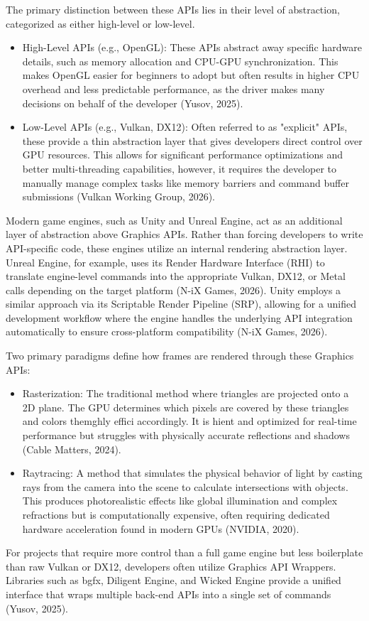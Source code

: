 \documentclass[manuscript,screen,12pt]{article}
\begin{document}
The primary distinction between these APIs lies in their level of abstraction, categorized as either high-level or low-level.

\begin{itemize}
	\item High-Level APIs (e.g., OpenGL): These APIs abstract away specific hardware details, such as memory allocation and CPU-GPU synchronization. This makes OpenGL easier for beginners to adopt but often results in higher CPU overhead and less predictable performance, as the driver makes many decisions on behalf of the developer (Yusov, 2025).
	\item Low-Level APIs (e.g., Vulkan, DX12): Often referred to as "explicit" APIs, these provide a thin abstraction layer that gives developers direct control over GPU resources. This allows for significant performance optimizations and better multi-threading capabilities, however, it requires the developer to manually manage complex tasks like memory barriers and command buffer submissions (Vulkan Working Group, 2026).
\end{itemize}

Modern game engines, such as Unity and Unreal Engine, act as an additional layer of abstraction above Graphics APIs. Rather than forcing developers to write API-specific code, these engines utilize an internal rendering abstraction layer. Unreal Engine, for example, uses its Render Hardware Interface (RHI) to translate engine-level commands into the appropriate Vulkan, DX12, or Metal calls depending on the target platform (N-iX Games, 2026). Unity employs a similar approach via its Scriptable Render Pipeline (SRP), allowing for a unified development workflow where the engine handles the underlying API integration automatically to ensure cross-platform compatibility (N-iX Games, 2026).

Two primary paradigms define how frames are rendered through these Graphics APIs:
\begin{itemize}
	\item Rasterization: The traditional method where triangles are projected onto a 2D plane. The GPU determines which pixels are covered by these triangles and colors themghly effici accordingly. It is hient and optimized for real-time performance but struggles with physically accurate reflections and shadows (Cable Matters, 2024).
	\item Raytracing: A method that simulates the physical behavior of light by casting rays from the camera into the scene to calculate intersections with objects. This produces photorealistic effects like global illumination and complex refractions but is computationally expensive, often requiring dedicated hardware acceleration found in modern GPUs (NVIDIA, 2020).
\end{itemize}
For projects that require more control than a full game engine but less boilerplate than raw Vulkan or DX12, developers often utilize Graphics API Wrappers. Libraries such as bgfx, Diligent Engine, and Wicked Engine provide a unified interface that wraps multiple back-end APIs into a single set of commands (Yusov, 2025).
\end{document}
